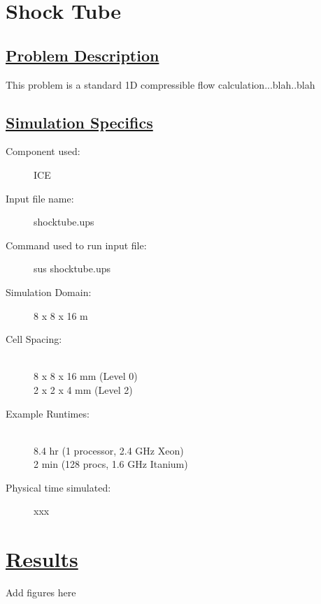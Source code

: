 \documentclass[fleqn]{article}
\begin{document}
\section*{\center Shock Tube}
\subsection*{\underline{Problem Description}}
This problem is a standard 1D compressible flow calculation...blah..blah
\cite{laney,sod}
 
\subsection*{\underline{Simulation Specifics}}
\begin{description} 
\item [Component used:] \hfill ICE
\item [Input file name:] \hfill shocktube.ups
\item [Command used to run input file:]\hfill sus shocktube.ups
\item [Simulation Domain:]\hfill    8 x 8 x 16 m

\item [Cell Spacing:]\hfill \\ 
8 x 8 x 16 mm (Level 0)\\
2 x 2 x 4 mm (Level 2)

\item [Example Runtimes:] \hfill \\
 8.4 hr   (1 processor, 2.4 GHz Xeon)\\
 2 min    (128 procs, 1.6 GHz Itanium)

\item [Physical time simulated:] \hfill xxx

\end{description}

\section*{\underline{Results}}
Add figures here



\end{document}
